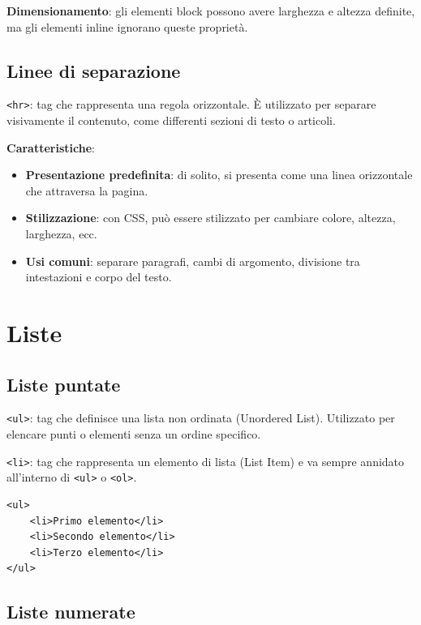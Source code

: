\textbf{Dimensionamento}: gli elementi block possono avere larghezza e altezza definite, ma gli elementi inline ignorano queste proprietà.

\subsection{Linee di separazione}

\texttt{<hr>}: tag che rappresenta una regola orizzontale. È utilizzato per separare visivamente il contenuto, come differenti sezioni di testo o articoli.

\textbf{Caratteristiche}:
\begin{itemize}
    \item \textbf{Presentazione predefinita}: di solito, si presenta come una linea orizzontale che attraversa la pagina.
    \item \textbf{Stilizzazione}: con CSS, può essere stilizzato per cambiare colore, altezza, larghezza, ecc.
    \item \textbf{Usi comuni}: separare paragrafi, cambi di argomento, divisione tra intestazioni e corpo del testo.
\end{itemize}

\section{Liste}

\subsection{Liste puntate}

\texttt{<ul>}: tag che definisce una lista non ordinata (Unordered List). Utilizzato per elencare punti o elementi senza un ordine specifico.

\texttt{<li>}: tag che rappresenta un elemento di lista (List Item) e va sempre annidato all'interno di \texttt{<ul>} o \texttt{<ol>}.

\begin{lstlisting}[language=HTML5, caption=Esempio di lista non ordinata]
<ul>
    <li>Primo elemento</li>
    <li>Secondo elemento</li>
    <li>Terzo elemento</li>
</ul>
\end{lstlisting}

\subsection{Liste numerate}

